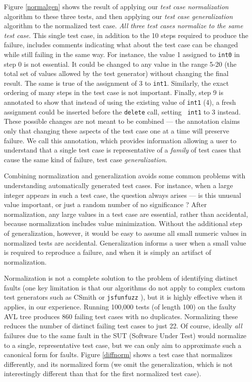 Figure \ref{normalgen} shows the result of applying our \emph{test case
  normalization} algorithm to these three tests, and then applying our
\emph{test case generalization} algorithm to the normalized test case.
\emph{All three test cases normalize to the same test
case}.  This single test case, in addition to the 10 steps required to produce
the failure, includes comments indicating what about the test case can
be changed while still failing in the same way.  For instance, the
value 1 assigned to {\tt int0} in step 0 is not essential.  It could
be changed to any value in the range 5-20 (the total set of values
allowed by the test generator) without changing the final result.  The
same is true of the assignment of 3 to {\tt int1}.  Similarly, the
exact ordering of many steps in the test case is not important.  Finally,
step 9 is annotated to show that instead of using the existing value
of {\tt int1} (4), a fresh assignment could be inserted before the
{\tt delete} call, setting {\tt
  int1} to 3 instead.  These possible
changes are not meant to be combined --- the annotation claims only
that changing these aspects of the test case one at a time will
preserve failure.  We call this annotation, which provides information
allowing a user to understand that a single test case is
representative of a \emph{family} of test cases that cause the same
kind of failure, test case \emph{generalization}.

Combining normalization and generalization avoids some common problems
with understanding automatically generated test cases.  For instance,
when a large integer appears in such a test case, the question always
arises --- is this unusual value important, or just a random number of
no significance \cite{MakeMost}?  After normalization, any large
values in a test case are essential, rather than
accidental, because normalization includes value minimization.
Without the additional step of generalization, however, it would be
easy to assume all small numeric values in normalized
tests are accidental.  Generalization informs a user when a small
value is required to reproduce a failure, and when it is simply an
artifact of normalization.

Normalization is not a complete solution to the problem of identifying
distinct faults (one key limitation is that our algorithms do not
apply to complex custom test generators such as CSmith \cite{csmith}
or {\tt jsfunfuzz} \cite{jsfunfuzz}), but it is highly effective when
it applies, in our experience.  Running 100,000 tests (of length 100)
on the faulty AVL tree produces 860 failing test cases with no
duplicates.  Normalizing these reduces the number of distinct failing
test cases to just 22.  Of course, ideally \emph{all} failures due to
the same fault in the SUT (Software Under Test) would normalize to a
single, representative test case, but we can only aim to approximate
such a canonical form for faults.  Figure \ref{diffnorm} shows a test
case that normalizes differently, and its normalized form (we omit the
generalization, which is not interestingly different than that for the
first normalized test case).


